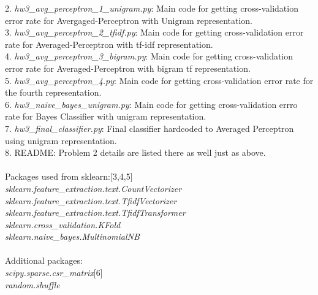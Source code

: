 \documentclass[fleqn]{article}
\begin{document}
	2. \textit{hw3\_avg\_perceptron\_1\_unigram.py}: Main code for getting cross-validation error rate for Avergaged-Perceptron with Unigram representation.\\
	3. \textit{hw3\_avg\_perceptron\_2\_tfidf.py}: Main code for getting cross-validation error rate for Averaged-Perceptron with tf-idf representation.\\
	4. \textit{hw3\_avg\_perceptron\_3\_bigram.py}: Main code for getting cross-validation error rate for Averaged-Perceptron with bigram tf representation.\\
	5. \textit{hw3\_avg\_perceptron\_4.py}: Main code for getting cross-validation error rate for the fourth representation.\\
	6. \textit{hw3\_naive\_bayes\_unigram.py}: Main code for getting cross-validation errro rate for Bayes Classifier with unigram representation.\\
	7. \textit{hw3\_final\_classifier.py}: Final classifier hardcoded to Averaged Perceptron using unigram representation.\\
	8. README: Problem 2 details are listed there as well just as above.\\
	\\
	Packages used from sklearn:[3,4,5]\\
	\textit{sklearn.feature\_extraction.text.CountVectorizer}\\
	\textit{sklearn.feature\_extraction.text.TfidfVectorizer}\\
	\textit{sklearn.feature\_extraction.text.TfidfTransformer}\\
	\textit{sklearn.cross\_validation.KFold}\\
	\textit{sklearn.naive\_bayes.MultinomialNB}\\
	\\
	Additional packages:\\
	\textit{scipy.sparse.csr\_matrix}[6]\\
	\textit{random.shuffle}\\
\end{document}
